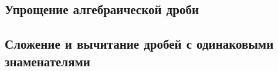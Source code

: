 \subsection{Упрощение алгебраической дроби}
\subsection{Сложение и вычитание дробей с одинаковыми знаменателями}
